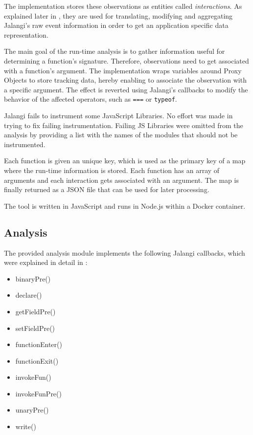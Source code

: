 The implementation stores these observations as entities called \textit{interactions}. As explained later in , they are used for translating, modifying and aggregating Jalangi's raw event information in order to get an application specific data representation.

The main goal of the run-time analysis is to gather information useful for determining a function's signature. Therefore, observations need to get associated with a function's argument. The implementation wraps variables around Proxy Objects to store tracking data, hereby enabling to associate the observation with a specific argument. The effect is reverted using Jalangi's callbacks to modify the behavior of the affected operators, such as \texttt{===} or \texttt{typeof}.

Jalangi fails to instrument some JavaScript Libraries. No effort was made in trying to fix failing instrumentation. Failing JS Libraries were omitted from the analysis by providing a list with the names of the modules that should not be instrumented.

Each function is given an unique key, which is used as the primary key of a map where the run-time information is stored. Each function has an array of arguments and each interaction gets associated with an argument. The map is finally returned as a JSON file that can be used for later processing.

The tool is written in JavaScript and runs in Node.js within a Docker container.



\subsection{Analysis} \label{sec:run-time-analysis}
The provided analysis module implements the following Jalangi callbacks, which were explained in detail in :
\begin{itemize}
  \item binaryPre()
  \item declare()
  \item getFieldPre()
  \item setFieldPre()
  \item functionEnter()
  \item functionExit()
  \item invokeFun()
  \item invokeFunPre()
  \item unaryPre()
  \item write()
\end{itemize}

